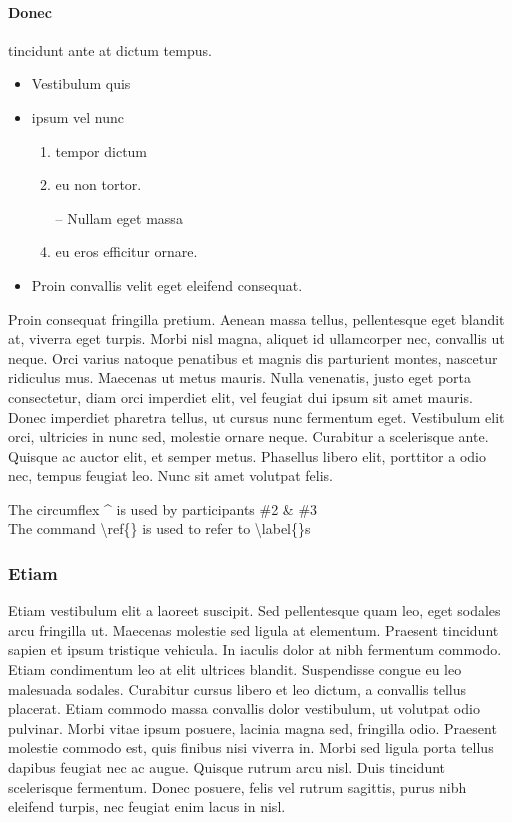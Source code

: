 \documentclass{scrartcl}
\begin{document}
\paragraph{Donec}
tincidunt ante at dictum tempus.

\begin{itemize}
 \item Vestibulum quis
 \item  ipsum vel nunc 
 \begin{enumerate}
  \item tempor dictum 
  \item eu non tortor. 
  \item[--] Nullam eget massa
  \item  eu eros efficitur ornare.
 \end{enumerate}
 \item  Proin convallis velit eget eleifend consequat.
\end{itemize}
Proin consequat fringilla pretium. Aenean massa tellus, pellentesque eget blandit at, viverra eget turpis. Morbi nisl magna, aliquet id ullamcorper nec, convallis ut neque. Orci varius natoque penatibus et magnis dis parturient montes, nascetur ridiculus mus. Maecenas ut metus mauris. Nulla venenatis, justo eget porta consectetur, diam orci imperdiet elit, vel feugiat dui ipsum sit amet mauris. Donec imperdiet pharetra tellus, ut cursus nunc fermentum eget. Vestibulum elit orci, ultricies in nunc sed, molestie ornare neque. Curabitur a scelerisque ante. Quisque ac auctor elit, et semper metus. Phasellus libero elit, porttitor a odio nec, tempus feugiat leo. Nunc sit amet volutpat felis. 


The circumflex \^{} is used by participants \#2 \& \#3\\
The command {\textbackslash}ref\{\} is used to refer to {\textbackslash}label\{\}s



\subsubsection{Etiam}
 Etiam vestibulum elit a laoreet suscipit. Sed pellentesque quam leo, eget sodales arcu fringilla ut. Maecenas molestie sed ligula at elementum. Praesent tincidunt sapien et ipsum tristique vehicula. In iaculis dolor at nibh fermentum commodo. Etiam condimentum leo at elit ultrices blandit. Suspendisse congue eu leo malesuada sodales. Curabitur cursus libero et leo dictum, a convallis tellus placerat. Etiam commodo massa convallis dolor vestibulum, ut volutpat odio pulvinar. Morbi vitae ipsum posuere, lacinia magna sed, fringilla odio. Praesent molestie commodo est, quis finibus nisi viverra in. Morbi sed ligula porta tellus dapibus feugiat nec ac augue. Quisque rutrum arcu nisl. Duis tincidunt scelerisque fermentum. Donec posuere, felis vel rutrum sagittis, purus nibh eleifend turpis, nec feugiat enim lacus in nisl. 
 
\end{document}
